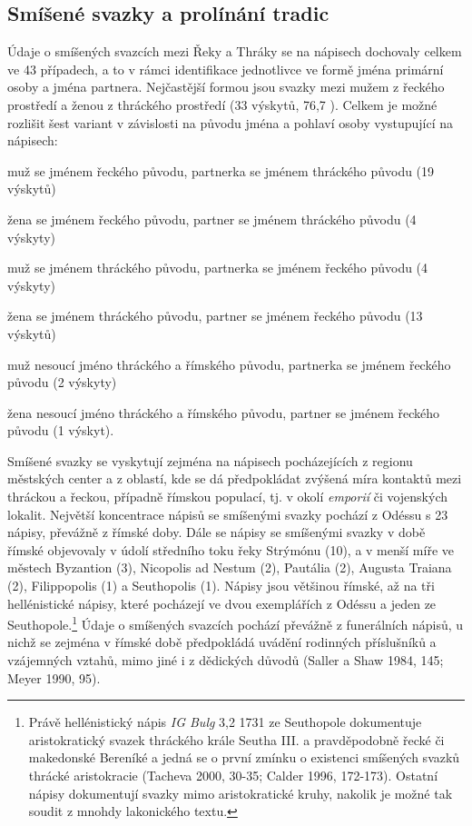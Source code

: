 
\subsection[smíšené-svazky-a-prolínání-tradic]{Smíšené svazky a prolínání tradic}

Údaje o smíšených svazcích mezi Řeky a Thráky se na nápisech dochovaly celkem ve 43 případech, a to v rámci identifikace jednotlivce ve formě jména primární osoby a jména partnera. Nejčastější formou jsou svazky mezi mužem z řeckého prostředí a ženou z thráckého prostředí (33 výskytů, 76,7 ). Celkem je možné rozlišit šest variant v závislosti na původu jména a pohlaví osoby vystupující na nápisech:

\startitemize[A][stopper=.]
\item
  \startblockquote
  muž se jménem řeckého původu, partnerka se jménem thráckého původu (19 výskytů)
  \stopblockquote
\item
  \startblockquote
  žena se jménem řeckého původu, partner se jménem thráckého původu (4 výskyty)
  \stopblockquote
\item
  \startblockquote
  muž se jménem thráckého původu, partnerka se jménem řeckého původu (4 výskyty)
  \stopblockquote
\item
  \startblockquote
  žena se jménem thráckého původu, partner se jménem řeckého původu (13 výskytů)
  \stopblockquote
\item
  \startblockquote
  muž nesoucí jméno thráckého a římského původu, partnerka se jménem řeckého původu (2 výskyty)
  \stopblockquote
\item
  \startblockquote
  žena nesoucí jméno thráckého a římského původu, partner se jménem řeckého původu (1 výskyt).
  \stopblockquote
\stopitemize

Smíšené svazky se vyskytují zejména na nápisech pocházejících z regionu městských center a z oblastí, kde se dá předpokládat zvýšená míra kontaktů mezi thráckou a řeckou, případně římskou populací, tj. v okolí {\em emporií} či vojenských lokalit. Největší koncentrace nápisů se smíšenými svazky pochází z Odéssu s 23 nápisy, převážně z římské doby. Dále se nápisy se smíšenými svazky v době římské objevovaly v údolí středního toku řeky Strýmónu (10), a v menší míře ve městech Byzantion (3), Nicopolis ad Nestum (2), Pautália (2), Augusta Traiana (2), Filippopolis (1) a Seuthopolis (1). Nápisy jsou většinou římské, až na tři hellénistické nápisy, které pocházejí ve dvou exemplářích z Odéssu a jeden ze Seuthopole.\footnote{Právě hellénistický nápis {\em IG Bulg} 3,2 1731 ze Seuthopole dokumentuje aristokratický svazek thráckého krále Seutha III. a pravděpodobně řecké či makedonské Bereníké a jedná se o první zmínku o existenci smíšených svazků thrácké aristokracie (Tacheva 2000, 30-35; Calder 1996, 172-173). Ostatní nápisy dokumentují svazky mimo aristokratické kruhy, nakolik je možné tak soudit z mnohdy lakonického textu.} Údaje o smíšených svazcích pochází převážně z funerálních nápisů, u nichž se zejména v římské době předpokládá uvádění rodinných příslušníků a vzájemných vztahů, mimo jiné i z dědických důvodů (Saller a Shaw 1984, 145; Meyer 1990, 95).

